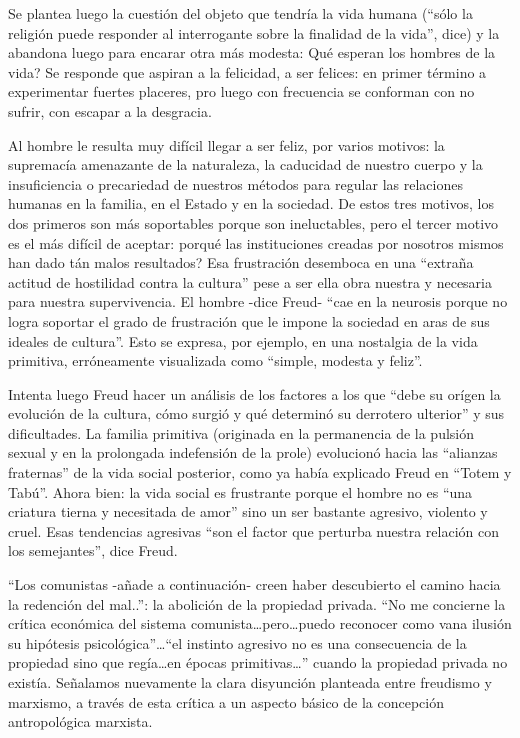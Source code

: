 \documentclass[
]{book}
\begin{document}
Se plantea luego la cuestión del objeto que tendría la vida humana (``sólo la religión puede responder al interrogante sobre la finalidad de la vida'', dice) y la abandona luego para encarar otra más modesta: Qué esperan los hombres de la vida? Se responde que aspiran a la felicidad, a ser felices: en primer término a experimentar fuertes placeres, pro luego con frecuencia se conforman con no sufrir, con escapar a la desgracia.

Al hombre le resulta muy difícil llegar a ser feliz, por varios motivos: la supremacía amenazante de la naturaleza, la caducidad de nuestro cuerpo y la insuficiencia o precariedad de nuestros métodos para regular las relaciones humanas en la familia, en el Estado y en la sociedad. De estos tres motivos, los dos primeros son más soportables porque son ineluctables, pero el tercer motivo es el más difícil de aceptar: porqué las instituciones creadas por nosotros mismos han dado tán malos resultados? Esa frustración desemboca en una ``extraña actitud de hostilidad contra la cultura'' pese a ser ella obra nuestra y necesaria para nuestra supervivencia. El hombre -dice Freud- ``cae en la neurosis porque no logra soportar el grado de frustración que le impone la sociedad en aras de sus ideales de cultura''. Esto se expresa, por ejemplo, en una nostalgia de la vida primitiva, erróneamente visualizada como ``simple, modesta y feliz''.

Intenta luego Freud hacer un análisis de los factores a los que ``debe su orígen la evolución de la cultura, cómo surgió y qué determinó su derrotero ulterior'' y sus dificultades. La familia primitiva (originada en la permanencia de la pulsión sexual y en la prolongada indefensión de la prole) evolucionó hacia las ``alianzas fraternas'' de la vida social posterior, como ya había explicado Freud en ``Totem y Tabú''. Ahora bien: la vida social es frustrante porque el hombre no es ``una criatura tierna y necesitada de amor'' sino un ser bastante agresivo, violento y cruel. Esas tendencias agresivas ``son el factor que perturba nuestra relación con los semejantes'', dice Freud.

``Los comunistas -añade a continuación- creen haber descubierto el camino hacia la redención del mal..'': la abolición de la propiedad privada. ``No me concierne la crítica económica del sistema comunista\ldots pero\ldots puedo reconocer como vana ilusión su hipótesis psicológica''\ldots{}``el instinto agresivo no es una consecuencia de la propiedad sino que regía\ldots en épocas primitivas\ldots{}'' cuando la propiedad privada no existía. Señalamos nuevamente la clara disyunción planteada entre freudismo y marxismo, a través de esta crítica a un aspecto básico de la concepción antropológica marxista.
\end{document}
